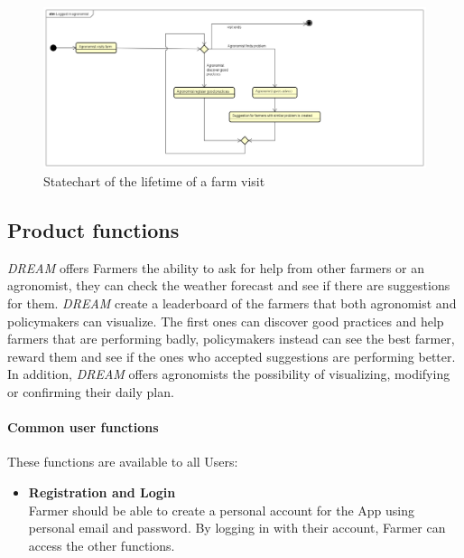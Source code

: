 \bigskip
\begin{figure}[H]
    \includegraphics[width=\textwidth,height=\textheight,keepaspectratio]{Images/agronomistVisitFarm.png}
    \caption{Statechart of the lifetime of a farm visit}
    \label{fig:statechart_agronomist_visit}
\end{figure}

\newpage
\subsection{Product functions}
\emph{DREAM} offers Farmers the ability to ask for help from other farmers or an agronomist, 
they can check the weather forecast and see if there are suggestions for them. 
\emph{DREAM} create a leaderboard of the farmers that both agronomist and policymakers can visualize. 
The first ones can discover good practices and help farmers that are performing badly, 
policymakers instead can see the best farmer, reward them and see if the ones who accepted 
suggestions are performing better. 
In addition, \emph{DREAM} offers agronomists the possibility of visualizing, modifying or confirming their daily plan.

\paragraph{Common user functions} These functions are available to all Users:
\begin{itemize}
    \item \textbf{Registration and Login}\\
          Farmer should be able to create a personal account for the App using personal email and password. By logging in with their account, 
          Farmer can access the other functions.
\end{itemize}

